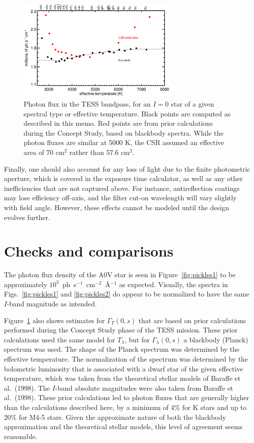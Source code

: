 \documentclass[preprint,10pt]{aastex}
\begin{document}
\begin{figure}
\begin{center}
\includegraphics[width=0.7\textwidth]{ph_versus_teff.eps}
\end{center}
\caption{Photon flux in the TESS bandpass, for an $I=0$ star of
a given spectral type or effective temperature.
Black points are computed as described in this memo.
Red points are from prior calculations during the Concept Study,
based on blackbody spectra. While the photon fluxes are similar at 5000 K,
the CSR assumed an effective area of 70 cm$^2$ rather than 57.6 cm$^2$.}
\label{fig:ph_versus_teff}
\end{figure}

Finally, one should also
account for any loss of light due to the finite photometric aperture, which is covered in the exposure time calculator, 
as well as any other inefficiencies that are not captured above. For instance, antireflection coatings may lose efficiency off-axis, and the filter cut-on wavelength will vary slightly with field angle. However, these effects cannot be modeled until the design evolves further.

\section{Checks and comparisons}

The photon flux density of the A0V star is seen in
Figure~\ref{fig:pickles1} to be approximately
$10^3$~ph~s$^{-1}$~cm$^{-2}$~\AA$^{-1}$ as expected.  Visually, the
spectra in Figs.~\ref{fig:pickles1} and \ref{fig:pickles2} do appear
to be normalized to have the same $I$-band magnitude as intended.

Figure~\ref{fig:ph_versus_teff} also shows estimates for $\Gamma_T(0,s)$ that are based on prior calculations performed during the Concept Study phase of the TESS mission. These prior calculations used the same model for $T_\lambda$, but
for $\Gamma_\lambda(0,s)$ a blackbody (Planck) spectrum was used.  The shape of the Planck spectrum was determined by the effective temperature.  The normalization of the spectrum was determined by the bolometric luminosity that is associated with a dwarf star of the given effective temperature, which was taken from the theoretical stellar models of Baraffe et al.~(1998).  The $I$-band absolute magnitudes were also taken from Baraffe et al.~(1998).  These prior calculations led to photon fluxes that are generally higher than the calculations described here, by a minimum of 4\% for K stars and up to 20\% for M4-5 stars.  Given the approximate nature of both the blackbody approximation and the theoretical stellar models, this level of agreement seems reasonable.
\end{document}
